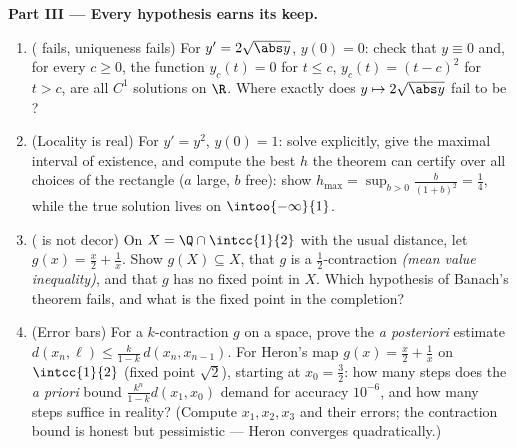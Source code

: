 \begin{problem}
\medskip
\noindent\textbf{Part III --- Every hypothesis earns its keep.}
\begin{enumerate}[resume]
  \item ( fails, uniqueness fails) For $y' =
        2\sqrt{\abs y}$, $y(0) = 0$: check that $y \equiv 0$
        and, for every $c \geq 0$, the function $y_c(t) = 0$ for
        $t \leq c$, $y_c(t) = (t - c)^2$ for $t > c$, are all
        $C^1$ solutions on $\R$. Where exactly does $y \mapsto
        2\sqrt{\abs y}$ fail to be ?
  \item (Locality is real) For $y' = y^2$, $y(0) = 1$: solve
        explicitly, give the maximal interval of existence, and
        compute the best $h$ the theorem can certify over all
        choices of the rectangle ($a$ large, $b$ free): show
        $h_{\max} = \sup_{b>0} \frac{b}{(1+b)^2} = \frac14$,
        while the true solution lives on $\intoo{-\infty}{1}$.
  \item ( is not decor) On $X = \Q \cap
        \intcc{1}{2}$ with the usual distance, let $g(x) =
        \frac x2 + \frac1x$. Show $g(X) \subseteq X$, that $g$
        is a $\frac12$-contraction \emph{(mean value
        inequality)}, and that $g$ has no fixed point in $X$.
        Which hypothesis of Banach's theorem fails, and what is
        the fixed point in the completion?
  \item (Error bars) For a $k$-contraction $g$ on a 
        space, prove the \emph{a posteriori} estimate $d(x_n,
        \ell) \leq \frac{k}{1-k}\,d(x_n, x_{n-1})$. For Heron's
        map $g(x) = \frac x2 + \frac 1x$ on $\intcc{1}{2}$
        (fixed point $\sqrt2$), starting at $x_0 = \frac32$:
        how many steps does the \emph{a priori} bound
        $\frac{k^n}{1-k}d(x_1, x_0)$ demand for accuracy
        $10^{-6}$, and how many steps suffice in reality?
        (Compute $x_1, x_2, x_3$ and their errors; the
        contraction bound is honest but pessimistic ---
        Heron converges quadratically.)
\end{enumerate}


\end{problem}
